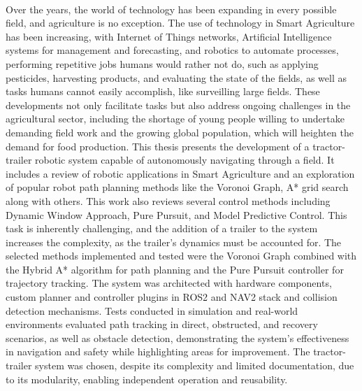 
%

\paragraph{}

Over the years, the world of technology has been expanding in every 
possible field, and agriculture is no exception. The use of technology in Smart 
Agriculture has been increasing, with Internet of Things networks, Artificial 
Intelligence systems for management and forecasting, and robotics to automate 
processes, performing repetitive jobs humans would rather not do, such as applying 
pesticides, harvesting products, and evaluating the state of the fields, as well as 
tasks humans cannot easily accomplish, like surveilling large fields. These developments
 not only facilitate tasks but also address ongoing challenges in the agricultural 
 sector, including the shortage of young people willing to undertake demanding field 
 work and the growing global population, which will heighten the demand for food 
 production. This thesis presents the development of a tractor-trailer robotic system 
 capable of autonomously navigating through a field. It includes a review of 
 robotic applications in Smart Agriculture and an exploration of popular robot path planning 
 methods like the Voronoi Graph, A* grid search along with others. This work also reviews several control methods 
 including Dynamic Window Approach, Pure Pursuit, and Model 
 Predictive Control. This task is inherently challenging, and the addition of a 
 trailer to the system increases the complexity, as the trailer's dynamics must be 
 accounted for. The selected methods implemented and tested were the Voronoi Graph 
 combined with the Hybrid A* algorithm for path planning and the Pure Pursuit controller for 
 trajectory tracking. The system was architected with hardware components, custom 
 planner and controller plugins in ROS2 and NAV2 stack and collision detection mechanisms. 
 Tests conducted in simulation and real-world 
 environments evaluated path tracking in direct, obstructed, and recovery scenarios, 
 as well as obstacle detection, demonstrating the system's effectiveness in navigation 
 and safety while highlighting areas for improvement. The tractor-trailer system was 
 chosen, despite its complexity and limited documentation, due to its modularity, 
 enabling independent operation and reusability.

